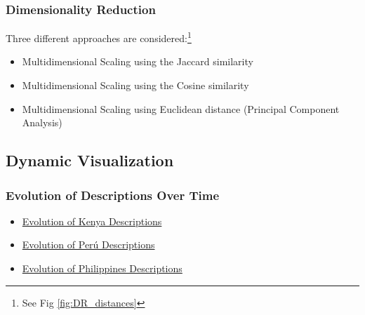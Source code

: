 \documentclass{beamer}
\begin{document}
\begin{frame}\frametitle{Dimensionality Reduction}
Three different approaches are considered:\footnote{See Fig \ref{fig:DR_distances}}
\begin{itemize}
\item Multidimensional Scaling using the Jaccard similarity
\item Multidimensional Scaling using the Cosine similarity
\item Multidimensional Scaling using Euclidean distance (Principal Component
Analysis)
\end{itemize}
\end{frame}


\subsection{Dynamic Visualization}
\begin{frame}\frametitle{Evolution of Descriptions Over Time}
\begin{itemize}
\item \href{https://github.com/mvalenti12/TFM/blob/master/gifs/gif_kenya.gif}{Evolution of Kenya Descriptions}
\item \href{https://github.com/mvalenti12/TFM/blob/master/gifs/gif_peru.gif}{Evolution of Perú Descriptions}
\item \href{https://github.com/mvalenti12/TFM/blob/master/gifs/gif_philippines.gif}{Evolution of Philippines Descriptions}
\end{itemize}
\end{frame}

\end{document}
